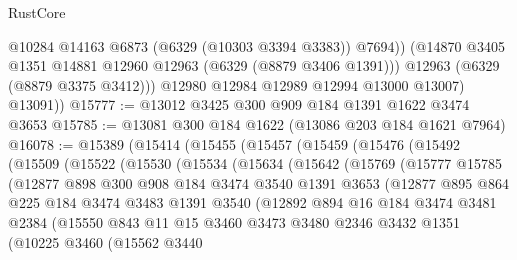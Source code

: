 \begin{lexlean}{RustCore}
\begin{coremodule}
                @10284
                @14163
                @6873
                (@6329 (@10303 @3394 @3383))
                @7694))
            (@14870 @3405 @1351 @14881 @12960 @12963 (@6329 (@8879 @3406 @1391)))
            @12963
            (@6329 (@8879 @3375 @3412)))
          @12980
          @12984
          @12989
          @12994
          @13000
          @13007)
        @13091))
@15777 := @13012 @3425 @300 @909 @184 @1391 @1622 @3474 @3653
@15785 := @13081 @300 @184 @1622 (@13086 @203 @184 @1621 @7964)
@16078 := @15389
    (@15414
      (@15455
        (@15457
          (@15459
            (@15476
              (@15492
                (@15509
                  (@15522
                    (@15530
                      (@15534
                        (@15634
                          (@15642
                            (@15769
                              (@15777
                                @15785
                                (@12877
                                  @898
                                  @300
                                  @908
                                  @184
                                  @3474
                                  @3540
                                  @1391
                                  @3653
                                  (@12877
                                    @895
                                    @864
                                    @225
                                    @184
                                    @3474
                                    @3483
                                    @1391
                                    @3540
                                    (@12892
                                      @894
                                      @16
                                      @184
                                      @3474
                                      @3481
                                      @2384
                                      (@15550
                                        @843
                                        @11
                                        @15
                                        @3460
                                        @3473
                                        @3480
                                        @2346
                                        @3432
                                        @1351
                                        (@10225
                                          @3460
                                          (@15562
                                            @3440

\end{coremodule}
\end{lexlean}
